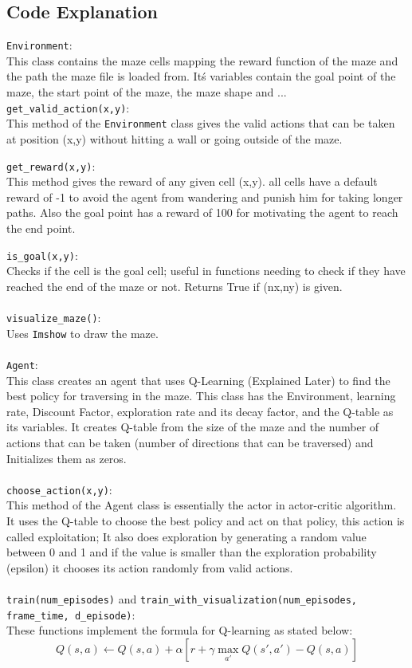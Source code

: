 \documentclass[11pt]{article}
\begin{document}
\subsection{Code Explanation}

\texttt{Environment}: \\
This class contains the maze cells mapping the reward function of the maze and the path
the maze file is loaded from. It\'s variables contain the goal point of the maze, the start point of the maze,
the maze shape and ... \\

\texttt{get\_valid\_action(x,y)}: \\
This method of the \texttt{Environment} class gives the valid actions that can be taken
at position (x,y) without hitting a wall or going outside of the maze.

\texttt{get\_reward(x,y)}: \\
This method gives the reward of any given cell (x,y). all cells have a default reward of -1
to avoid the agent from wandering and punish him for taking longer paths. Also the goal point has a reward
of 100 for motivating the agent to reach the end point.

\texttt{is\_goal(x,y)}: \\
Checks if the cell is the goal cell; useful in functions needing to check if they have
reached the end of the maze or not. Returns True if (nx,ny) is given.
\\ \\ 
\texttt{visualize\_maze()}: \\
Uses \texttt{Imshow} to draw the maze.
\\ \\
\texttt{Agent}: \\
This class creates an agent that uses Q-Learning (Explained Later) to find the best
policy for traversing in the maze. This class has the Environment, learning rate, Discount Factor,
exploration rate and its decay factor, and the Q-table as its variables. It creates Q-table from
the size of the maze and the number of actions that can be taken (number of directions that can be traversed)
and Initializes them as zeros.
\\ \\
\texttt{choose\_action(x,y)}: \\
This method of the Agent class is essentially the actor in actor-critic algorithm.
It uses the Q-table to choose the best policy and act on that policy, this action is called exploitation;
It also does exploration by generating a random value between 0 and 1 and if the value is smaller
than the exploration probability (epsilon) it chooses its action randomly from valid actions.
\\ \\
\texttt{train(num\_episodes)} and \texttt{train\_with\_visualization(num\_episodes, frame\_time, d\_episode)}: \\
These functions implement the formula for Q-learning as stated below:
\begin{equation}
    Q(s, a) \leftarrow Q(s, a) + \alpha \left[ r + \gamma \max_{a'} Q(s', a') - Q(s, a) \right]
\end{equation}
\end{document}
